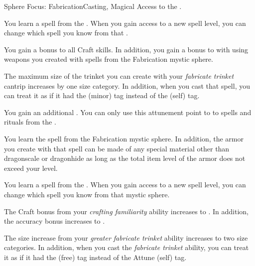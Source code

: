     \begin{feat}{Sphere Focus: Fabrication}{Casting, Magical}
        \featpre Access to the  .

         You learn a spell from the  .
        When you gain access to a new spell level, you can change which spell you know from that .

         You gain a  bonus to all Craft skills.
        In addition, you gain a  bonus to  with  using weapons you created with spells from the Fabrication mystic sphere.

         The maximum size of the trinket you can create with your \textit{fabricate trinket} cantrip increases by one size category.
        In addition, when you cast that spell, you can treat it as if it had the  (minor) tag instead of the  (self) tag.

         You gain an additional .
        You can only use this attunement point to  to spells and rituals from the  .

         You learn the  spell from the Fabrication mystic sphere.
        In addition, the armor you create with that spell can be made of any special material other than dragonscale or dragonhide as long as the total item level of the armor does not exceed your level.

         You learn a spell from the  .
        When you gain access to a new spell level, you can change which spell you know from that mystic sphere.

         The Craft bonus from your \textit{crafting familiarity} ability increases to .
        In addition, the accuracy bonus increases to .

         The size increase from your \textit{greater fabricate trinket} ability increases to two size categories.
        In addition, when you cast the \textit{fabricate trinket} ability, you can treat it as if it had the  (free) tag instead of the Attune (self) tag.
    \end{feat}

